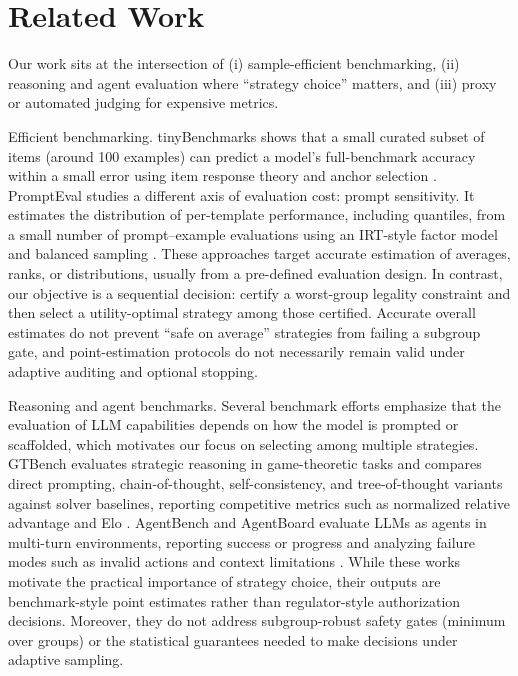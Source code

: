 \documentclass{article} %
\begin{document}
\section{Related Work}
\label{sec:related}
Our work sits at the intersection of (i) sample-efficient benchmarking, (ii) reasoning and agent evaluation where “strategy choice” matters, and (iii) proxy or automated judging for expensive metrics.

Efficient benchmarking. tinyBenchmarks shows that a small curated subset of items (around 100 examples) can predict a model’s full-benchmark accuracy within a small error using item response theory and anchor selection \cite{polo-2024-tinybenchmarks}. PromptEval studies a different axis of evaluation cost: prompt sensitivity. It estimates the distribution of per-template performance, including quantiles, from a small number of prompt--example evaluations using an IRT-style factor model and balanced sampling \cite{polo-2024-efficient}. These approaches target accurate estimation of averages, ranks, or distributions, usually from a pre-defined evaluation design. In contrast, our objective is a sequential decision: certify a worst-group legality constraint and then select a utility-optimal strategy among those certified. Accurate overall estimates do not prevent “safe on average” strategies from failing a subgroup gate, and point-estimation protocols do not necessarily remain valid under adaptive auditing and optional stopping.

Reasoning and agent benchmarks. Several benchmark efforts emphasize that the evaluation of LLM capabilities depends on how the model is prompted or scaffolded, which motivates our focus on selecting among multiple strategies. GTBench evaluates strategic reasoning in game-theoretic tasks and compares direct prompting, chain-of-thought, self-consistency, and tree-of-thought variants against solver baselines, reporting competitive metrics such as normalized relative advantage and Elo \cite{duan-2024-gtbench}. AgentBench and AgentBoard evaluate LLMs as agents in multi-turn environments, reporting success or progress and analyzing failure modes such as invalid actions and context limitations \cite{liu-2023-agentbench,ma-2024-agentboard}. While these works motivate the practical importance of strategy choice, their outputs are benchmark-style point estimates rather than regulator-style authorization decisions. Moreover, they do not address subgroup-robust safety gates (minimum over groups) or the statistical guarantees needed to make decisions under adaptive sampling.
\end{document}
